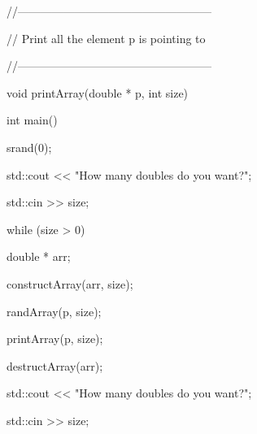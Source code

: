 \begin{consolethree}[escapeinside=||]
//---------------------------------------------------

// Print all the element p is pointing to

//---------------------------------------------------

void printArray(double * p, int size)

{

}



int main()

{

    srand(0);

    std::cout << "How many doubles do you want?";

    std::cin >> size;



    while (size > 0)

    {

        double * arr;

        constructArray(arr, size);

        randArray(p, size);

        printArray(p, size);

        destructArray(arr);

        std::cout << "How many doubles do you want?";

        std::cin >> size;

    }

}

\end{consolethree}

